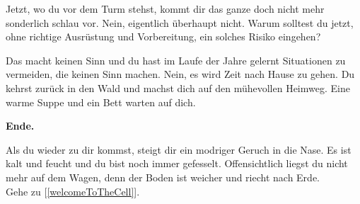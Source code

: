 
Jetzt, wo du vor dem Turm stehst, kommt dir das ganze doch nicht mehr sonderlich schlau vor. Nein, eigentlich überhaupt nicht. Warum solltest du jetzt, ohne richtige Ausrüstung und Vorbereitung, ein solches Risiko eingehen?

Das macht keinen Sinn und du hast im Laufe der Jahre gelernt Situationen zu vermeiden, die keinen Sinn machen. Nein, es wird Zeit nach Hause zu gehen. Du kehrst zurück in den Wald und machst dich auf den mühevollen Heimweg. Eine warme Suppe und ein Bett warten auf dich.

\textbf{Ende.}


Als du wieder zu dir kommst, steigt dir ein modriger Geruch in die Nase. Es ist kalt und feucht und du bist noch immer gefesselt. Offensichtlich liegst du nicht mehr auf dem Wagen, denn der Boden ist weicher und riecht nach Erde.
\\Gehe zu [\ref{welcomeToTheCell}].
